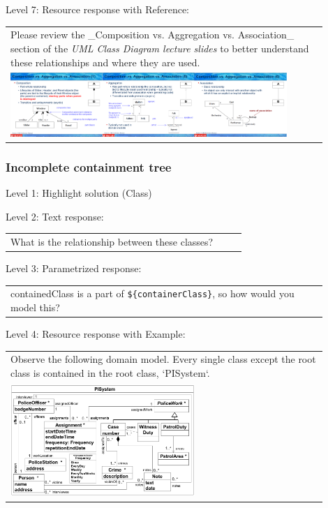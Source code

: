 \noindent Level 7: Resource response with Reference: \medskip

\begin{tabular}{|p{0.9\linewidth}}
Please review the _Composition vs. Aggregation vs. Association_ section of 
the \textit{UML Class Diagram lecture slides} to 
better understand these relationships and where they are used.

\\
\includegraphics[width=0.9\textwidth]{images/composition_aggregation_association.png}
\end{tabular} \medskip


\subsubsection{Incomplete containment tree}

\noindent Level 1: Highlight solution (Class) \medskip

\noindent Level 2: Text response: \medskip

\begin{tabular}{|p{0.9\linewidth}}
What is the relationship between these classes?
\end{tabular} \medskip

\noindent Level 3: Parametrized response: \medskip

\begin{tabular}{|p{0.9\linewidth}}
{containedClass} is a part of \verb|${containerClass}|, so how would you model this?
\end{tabular} \medskip

\noindent Level 4: Resource response with Example: \medskip

\begin{tabular}{|p{0.9\linewidth}}
Observe the following domain model. Every single class except the root class is contained in the 
root class, `PISystem`.

\\
\includegraphics[width=0.6\textwidth]{images/PISystem.png}
\end{tabular} \medskip

